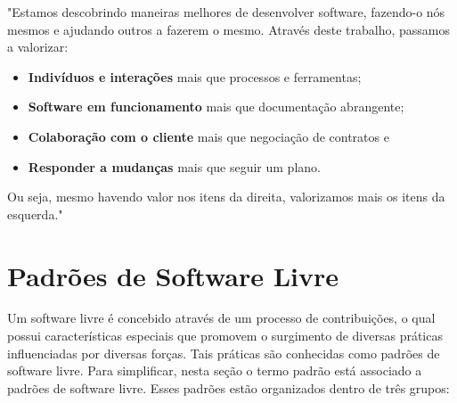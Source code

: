 \begin{mdframed}
"Estamos descobrindo maneiras melhores de desenvolver software, fazendo-o nós mesmos
e ajudando outros a fazerem o mesmo. Através deste trabalho, passamos a valorizar:

\begin{itemize}
\item \textbf{Indivíduos e interações} mais que processos e ferramentas;
\item \textbf{Software em funcionamento} mais que documentação abrangente;
\item \textbf{Colaboração com o cliente} mais que negociação de contratos e
\item \textbf{Responder a mudanças} mais que seguir um plano.
\end{itemize}

Ou seja, mesmo havendo valor nos itens da direita, valorizamos mais os itens da esquerda."
\end{mdframed}


\section{Padrões de Software Livre}

Um software livre é concebido através de um processo de contribuições, o qual possui características especiais que promovem o surgimento de diversas práticas influenciadas por diversas forças. Tais práticas são conhecidas como padrões de software livre. Para simplificar, nesta seção o termo padrão está associado a padrões de software livre. Esses padrões estão organizados dentro de três grupos:

